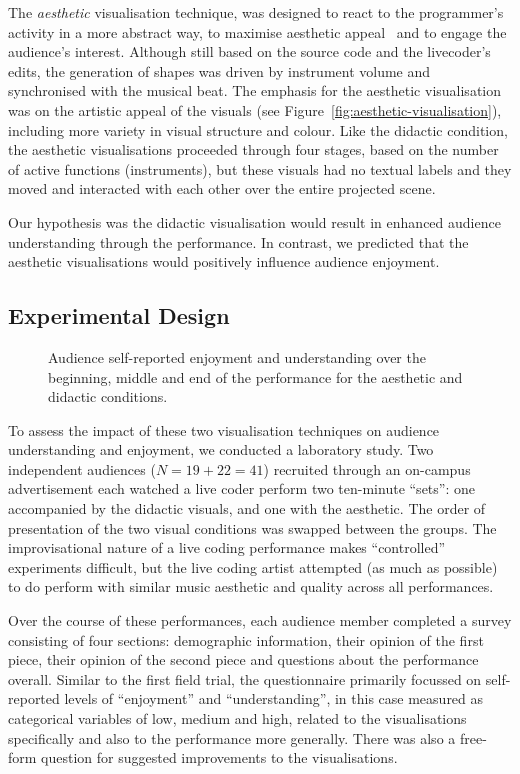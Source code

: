 \documentclass{sig-alternate}
\begin{document}
The \emph{aesthetic} visualisation technique, was designed to react to
the programmer's activity in a more abstract way, to maximise
aesthetic appeal~\cite{Cawthon2007} and to engage the audience's
interest. Although still based on the source code and the livecoder's
edits, the generation of shapes was driven by instrument volume and
synchronised with the musical beat. The emphasis for the aesthetic
visualisation was on the artistic appeal of the visuals (see
Figure~\ref{fig:aesthetic-visualisation}), including more variety in
visual structure and colour. Like the didactic condition, the
aesthetic visualisations proceeded through four stages, based on the
number of active functions (instruments), but these visuals had no
textual labels and they moved and interacted with each other over the
entire projected scene.

Our hypothesis was the didactic visualisation would result in enhanced
audience understanding through the performance. In contrast, we
predicted that the aesthetic visualisations would positively influence
audience enjoyment.

\subsection{Experimental Design}

\begin{figure*}
\centering
{}
\caption{Audience self-reported enjoyment and understanding over the
beginning, middle and end of the performance for the aesthetic and
didactic conditions.}
\label{fig:enjoyment-understanding}
\end{figure*}

To assess the impact of these two visualisation techniques on audience
understanding and enjoyment, we conducted a laboratory study. Two
independent audiences ($N=19+22=41$) recruited through an on-campus
advertisement each watched a live coder perform two ten-minute
``sets'': one accompanied by the didactic visuals, and one with the
aesthetic. The order of presentation of the two visual conditions was
swapped between the groups. The improvisational nature of a live
coding performance makes ``controlled'' experiments difficult, but the
live coding artist attempted (as much as possible) to do perform with
similar music aesthetic and quality across all performances.

Over the course of these performances, each audience member completed
a survey consisting of four sections: demographic information, their
opinion of the first piece, their opinion of the second piece and
questions about the performance overall. Similar to the first field
trial, the questionnaire primarily focussed on self-reported levels of
``enjoyment'' and ``understanding'', in this case measured as
categorical variables of low, medium and high, related to the
visualisations specifically and also to the performance more
generally. There was also a free-form question for suggested
improvements to the visualisations.
\end{document}
